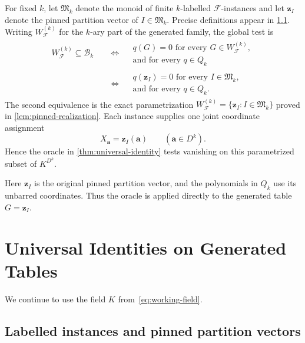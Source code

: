 \documentclass[11pt]{article}
\theoremstyle{plain}
\theoremstyle{definition}
\theoremstyle{remark}
\newcommand{\cF}{\mathcal F}
\newcommand{\zvec}[1]{\mathbf z_{#1}}
\newcommand{\InstMonoid}[1]{\mathfrak M_{#1}}
\begin{document}
For fixed $k$, let $\InstMonoid{k}$ denote the monoid of finite $k$-labelled
$\cF$-instances and let $\zvec I$ denote the pinned partition vector of
$I\in\InstMonoid{k}$.  Precise definitions appear in
\cref{subsec:labelled-instances}.  Writing $W_{\cF}^{(k)}$ for the $k$-ary
part of the generated family, the global test is
\begin{equation*}
\begin{aligned}
  W_{\cF}^{(k)}\subseteq\mathcal B_k
  &\quad\Longleftrightarrow\quad
  \begin{gathered}
    q(G)=0\text{ for every }G\in W_{\cF}^{(k)},\\[-2pt]
    \text{and for every }q\in Q_k
  \end{gathered}\\
  &\quad\Longleftrightarrow\quad
  \begin{gathered}
    q(\zvec I)=0\text{ for every }I\in\InstMonoid{k},\\[-2pt]
    \text{and for every }q\in Q_k.
  \end{gathered}
\end{aligned}
\end{equation*}
The second equivalence is the exact parametrization
$W_{\cF}^{(k)}=\{\zvec I:I\in\InstMonoid{k}\}$ proved in
\cref{lem:pinned-realization}.  Each instance supplies one joint coordinate
assignment
\[
  X_{\mathbf a}=\zvec I(\mathbf a)
  \qquad(\mathbf a\in D^k).
\]
Hence the oracle in \cref{thm:universal-identity} tests vanishing on this
parametrized subset of $K^{D^k}$.

Here $\zvec I$ is the original pinned partition vector, and the polynomials in
$Q_k$ use its unbarred coordinates.  Thus the oracle is applied directly to
the generated table $G=\zvec I$.

\section{Universal Identities on Generated Tables}
\label{sec:universal-identities}

We continue to use the field $K$ from~\eqref{eq:working-field}.

\subsection{Labelled instances and pinned partition vectors}
\label{subsec:labelled-instances}
\end{document}
